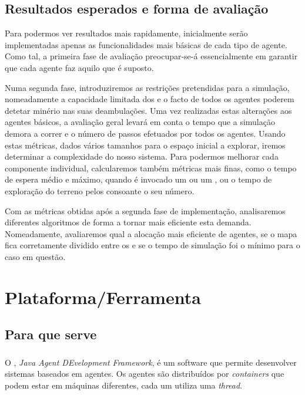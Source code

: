 \documentclass[12pt]{report}
\begin{document}
\section{Resultados esperados e forma de avaliação}

Para podermos ver resultados mais rapidamente, inicialmente serão implementadas apenas as funcionalidades mais básicas de cada tipo de agente. Como tal, a primeira fase de avaliação preocupar-se-á essencialmente em garantir que cada agente faz aquilo que é suposto.

Numa segunda fase, introduziremos as restrições pretendidas para a simulação, nomeadamente a capacidade limitada dos \transporters e o facto de todos os agentes poderem detetar minério nas suas deambulações. Uma vez realizadas estas alterações aos agentes básicos, a avaliação geral levará em conta o tempo que a simulação demora a correr e o número de passos efetuados por todos os agentes. Usando estas métricas, dados vários tamanhos para o espaço inicial a explorar, iremos determinar a complexidade do nosso sistema. Para podermos melhorar cada componente individual, calcularemos também métricas mais finas, como o tempo de espera médio e máximo, quando é invocado um \producer ou um \transporter, ou o tempo de exploração do terreno pelos \spotters consoante o seu número.

Com as métricas obtidas após a segunda fase de implementação, analisaremos diferentes algoritmos de forma a tornar mais eficiente esta demanda. Nomeadamente, avaliaremos qual a alocação mais eficiente de agentes, se o mapa fica corretamente dividido entre os \spotters e se o tempo de simulação foi o mínimo para o caso em questão.


\chapter{Plataforma/Ferramenta}

\section{Para que serve}

\subsection{\jade}
O \jade, \emph{Java Agent DEvelopment Framework}, é um software que permite desenvolver sistemas baseados em agentes. Os agentes são distribuídos por \emph{containers} que podem estar em máquinas diferentes, cada um utiliza uma \emph{thread}. 
\end{document}
